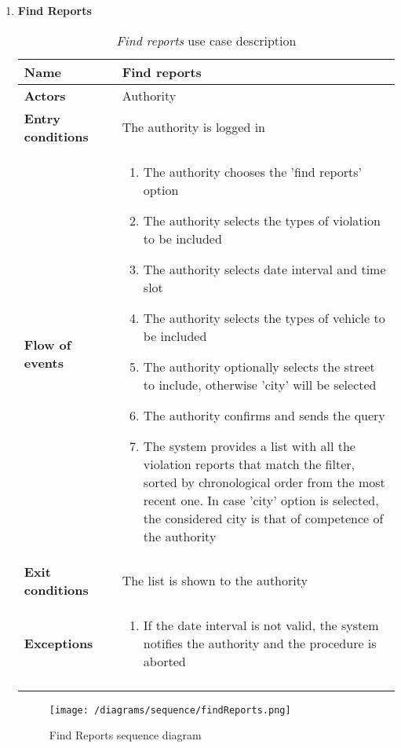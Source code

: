 \begin{enumerate}
				\FloatBarrier
				\newpage
			\item \textbf{Find Reports}
				\begin{longtable}{p{0.26\linewidth}p{0.75\linewidth}}
					\toprule
					\textbf{Name} & \textbf{Find reports} \\
					\midrule
					\textbf{Actors} & Authority\\
					\midrule
					\textbf{Entry conditions} & The authority is logged in \\
					\midrule
					\textbf{Flow of events} & 
					\begin{enumerate}
						\item The authority chooses the 'find reports' option
						\item The authority selects the types of violation to be included
						\item The authority selects date interval and time slot
						\item The authority selects the types of vehicle to be included
						\item The authority optionally selects the street to include, otherwise 'city' will be selected
						\item The authority confirms and sends the query
						\item The system provides a list with all the violation reports that match the filter, sorted by chronological order from the most recent one. In case 'city' option is selected, the considered city is that of competence of the authority
					\end{enumerate} \\
					\midrule
					\textbf{Exit conditions} & The list is shown to the authority\\
					\midrule
					\textbf{Exceptions} &  
					\begin{enumerate}
						\item If the date interval is not valid, the system notifies the authority and the procedure is aborted
					\end{enumerate}\\
					\bottomrule
					\caption{\emph{Find reports} use case description}
				\end{longtable}
	
				\begin{figure}[hbtp]
					\centering
					\texttt{[image: /diagrams/sequence/findReports.png]}
					\caption{Find Reports sequence diagram}
				\end{figure}
		\end{enumerate}

